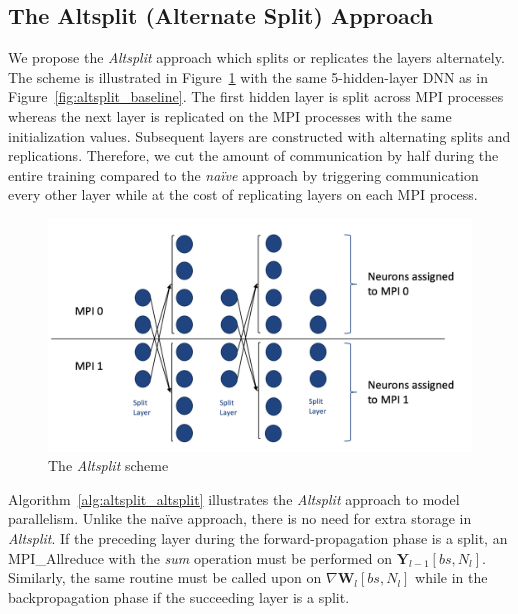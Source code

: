 \subsection{The Altsplit (Alternate Split) Approach}
We propose the \emph{Altsplit} approach which splits or replicates the layers 
alternately. The scheme is illustrated in Figure~\ref{fig:altsplit_scheme} with 
the same 5-hidden-layer DNN as in Figure~\ref{fig:altsplit_baseline}. The first 
hidden layer is split across MPI processes whereas the next layer is replicated 
on the MPI processes with the same initialization values. Subsequent layers are 
constructed with alternating splits and replications. Therefore, we cut the 
amount of communication by half during the entire training compared to the 
\emph{na\"{i}ve} approach by triggering communication every other layer while at 
the cost of replicating layers on each MPI process.
\begin{figure}[H]
    \centerline{\includegraphics[scale=0.60]{altsplit/figs/altsplit.png}}
    \caption{The \emph{Altsplit} scheme}
    \label{fig:altsplit_scheme}
\end{figure}

Algorithm~\ref{alg:altsplit_altsplit} illustrates the \emph{Altsplit} approach 
to model parallelism. Unlike the na\"{i}ve approach, there is no need for extra 
storage in \emph{Altsplit}. If the preceding layer during the 
forward-propagation phase is a split, an MPI\_Allreduce with the \textit{sum} 
operation must be performed on $\pmb{Y}_{l-1}[bs, N_{l}]$. Similarly, the same 
routine must be called upon on $\nabla \pmb{W}_l[bs, N_l]$ while in the 
backpropagation phase if the succeeding layer is a split.

